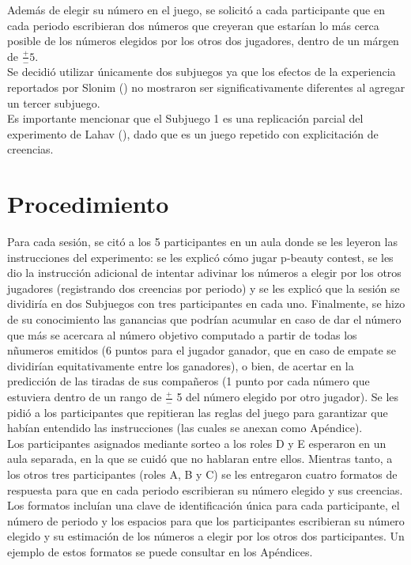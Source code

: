 Además de elegir su número en el juego, se solicitó a cada participante que en cada periodo escribieran dos números que creyeran que estarían lo más cerca posible de los números elegidos por los otros dos jugadores, dentro de un márgen de $\frac{+}{-}5$.\\

Se decidió utilizar únicamente dos subjuegos ya que los efectos de la experiencia reportados por Slonim (\citeyear{Slonim}) no mostraron ser significativamente diferentes al agregar un tercer subjuego.\\

Es importante mencionar que el Subjuego 1 es una replicación parcial del experimento de Lahav (\citeyear{Lahav}), dado que es un juego repetido con explicitación de creencias.\\

\section{Procedimiento}

Para cada sesión, se citó a los 5 participantes en un aula donde se les leyeron las instrucciones del experimento: se les explicó cómo jugar p-beauty contest, se les dio la instrucción adicional de intentar adivinar los números a elegir por los otros jugadores (registrando dos creencias por periodo) y se les explicó que la sesión se dividiría en dos Subjuegos con tres participantes en cada uno. Finalmente, se hizo de su conocimiento las ganancias que podrían acumular en caso de dar el número que más se acercara al número objetivo computado a partir de todas los nñumeros emitidos (6 puntos para el jugador ganador, que en caso de empate se dividirían equitativamente entre los ganadores), o bien, de acertar en la predicción de las tiradas de sus compañeros (1 punto por cada número que estuviera dentro de un rango de $\frac{+}{-}$ 5 del número elegido por otro jugador). Se les pidió a los participantes que repitieran las reglas del juego para garantizar que habían entendido las instrucciones (las cuales se anexan como Apéndice).\\

Los participantes asignados mediante sorteo a los roles D y E esperaron en un aula separada, en la que se cuidó que no hablaran entre ellos. Mientras tanto, a los otros tres participantes (roles A, B y C) se les entregaron cuatro formatos de respuesta para que en cada periodo escribieran su número elegido y sus creencias. Los formatos incluían una clave de identificación única para cada participante, el número de periodo y los espacios para que los participantes escribieran su número elegido y su estimación de los números a elegir por los otros dos participantes. Un ejemplo de estos formatos se puede consultar en los Apéndices.\\

